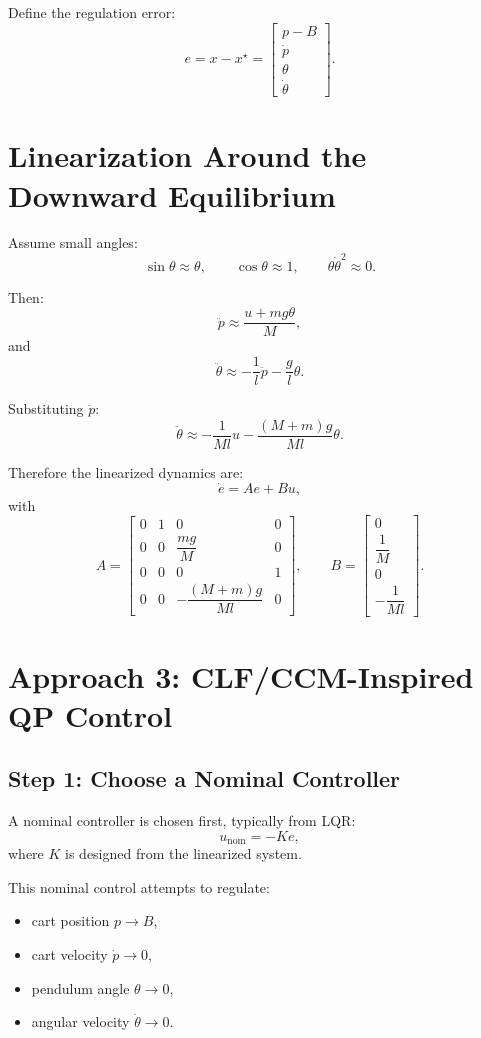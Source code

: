 \documentclass[11pt,a4paper]{article}
\begin{document}
Define the regulation error:
\[
e = x - x^\star =
\begin{bmatrix}
p-B \\ \dot p \\ \theta \\ \dot\theta
\end{bmatrix}.
\]

\section{Linearization Around the Downward Equilibrium}

Assume small angles:
\[
\sin\theta \approx \theta,
\qquad
\cos\theta \approx 1,
\qquad
\theta\dot\theta^2 \approx 0.
\]

Then:
\[
\ddot p \approx \frac{u + mg\theta}{M},
\]
and
\[
\ddot\theta \approx -\frac{1}{l}\ddot p - \frac{g}{l}\theta.
\]

Substituting \(\ddot p\):
\[
\ddot\theta \approx -\frac{1}{Ml}u - \frac{(M+m)g}{Ml}\theta.
\]

Therefore the linearized dynamics are:
\[
\dot e = Ae + Bu,
\]
with
\[
A =
\begin{bmatrix}
0 & 1 & 0 & 0 \\
0 & 0 & \dfrac{mg}{M} & 0 \\
0 & 0 & 0 & 1 \\
0 & 0 & -\dfrac{(M+m)g}{Ml} & 0
\end{bmatrix},
\qquad
B =
\begin{bmatrix}
0 \\[1ex]
\dfrac{1}{M} \\[1ex]
0 \\[1ex]
-\dfrac{1}{Ml}
\end{bmatrix}.
\]

\section{Approach 3: CLF/CCM-Inspired QP Control}

\subsection{Step 1: Choose a Nominal Controller}

A nominal controller is chosen first, typically from LQR:
\[
u_{\mathrm{nom}} = -Ke,
\]
where \(K\) is designed from the linearized system.

This nominal control attempts to regulate:
\begin{itemize}[leftmargin=2em]
    \item cart position \(p \to B\),
    \item cart velocity \(\dot p \to 0\),
    \item pendulum angle \(\theta \to 0\),
    \item angular velocity \(\dot\theta \to 0\).
\end{itemize}
\end{document}
